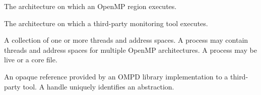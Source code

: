 {\begin{comment}
}
{\color{blue}
\end{comment}

\glossarydefstart
The architecture on which an OpenMP region executes.
\glossarydefend

\glossarydefstart
The architecture on which a third-party monitoring tool executes.
\glossarydefend

\glossarydefstart
A collection of one or more threads and address spaces. A process may contain threads and address spaces for multiple OpenMP architectures.
A process may be live or a core file. 
\glossarydefend

\glossarydefstart
An opaque reference provided by an OMPD library implementation to a third-party tool. A handle uniquely identifies an abstraction.

\glossarydefend

}
